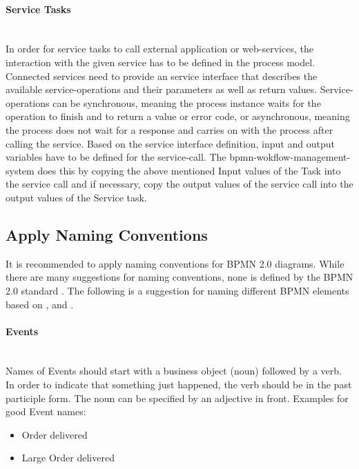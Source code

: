 \paragraph{Service Tasks}~\\
In order for service tasks to call external application or web-services, the interaction with the given service has to be defined in the process model. Connected services need to provide an service interface that describes the available service-operations and their parameters as well as return values. Service-operations can be synchronous, meaning the process instance waits for the operation to finish and to return a value or error code, or asynchronous, meaning the process does not wait for a response and carries on with the process after calling the service. Based on the service interface definition, input and output variables have to be defined for the service-call. The \gls{bpmn-wokflow-management-system} does this by copying the above mentioned Input values of the Task into the service call and if necessary, copy the output values of the service call into the output values of the Service task. \cite{fundamentals}

\subsection{Apply Naming Conventions}
\label{naming}
It is recommended to apply naming conventions for BPMN 2.0 diagrams. While there are many suggestions for naming conventions, none is defined by the BPMN 2.0 standard \cite{bpmnstandard}. The following is a suggestion for naming different BPMN elements based on  \cite{freund2019real}, \cite{c}   \cite{suarez2010best} and \cite{radulian2020rethinking}. 

\paragraph{Events}~\\
Names of Events should start with a business object (noun) followed by a verb. In order to indicate that something just happened, the verb should be in the past participle form. The noun can be specified by an adjective in front. Examples for good Event names: 
\begin{itemize}
	\item Order delivered
	\item Large Order delivered
\end{itemize}

